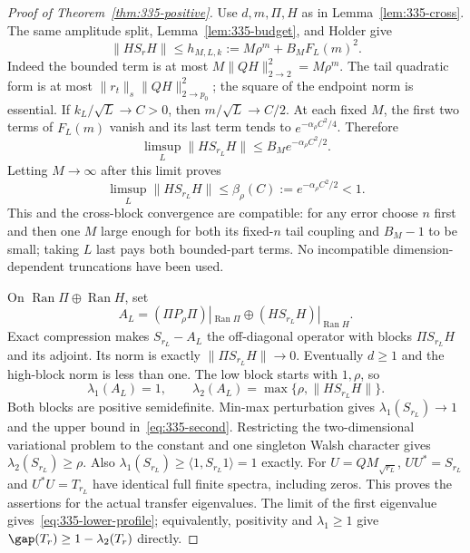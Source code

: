 \begin{proof}[Proof of Theorem~\ref{thm:335-positive}]
Use $d,m,\Pi,H$ as in Lemma~\ref{lem:335-cross}. The same amplitude
split, Lemma~\ref{lem:335-budget}, and Holder give
\begin{equation}\label{eq:335-high}
 \|HS_rH\|\le h_{M,L,k}:=M\rho^m+B_MF_L(m)^2.
\end{equation}
Indeed the bounded term is at most $M\|QH\|_{2\to2}^2=M\rho^m$.
The tail quadratic form is at most
$\|r_t\|_s\|QH\|_{2\to p_0}^2$; the square of the endpoint norm
is essential. If $k_L/\sqrt L\to C>0$, then $m/\sqrt L\to C/2$.
At each fixed $M$, the first two terms of $F_L(m)$ vanish and its last
term tends to $e^{-\alpha_\rho C^2/4}$. Therefore
\[
 \limsup_L\|HS_{r_L}H\|\le B_Me^{-\alpha_\rho C^2/2}.
\]
Letting $M\to\infty$ after this limit proves
\begin{equation}\label{eq:335-beta}
 \limsup_L\|HS_{r_L}H\|\le\beta_\rho(C)
 :=e^{-\alpha_\rho C^2/2}<1.
\end{equation}
This and the cross-block convergence are compatible: for any error choose
$n$ first and then one $M$ large enough for both its fixed-$n$ tail
coupling and $B_M-1$ to be small; taking $L$ last pays both bounded-part
terms. No incompatible dimension-dependent truncations have been used.

On $\operatorname{Ran}\Pi\oplus\operatorname{Ran}H$, set
\[
 A_L=(\Pi P_\rho\Pi)|_{\operatorname{Ran}\Pi}
       \oplus(HS_{r_L}H)|_{\operatorname{Ran}H}.
\]
Exact compression makes $S_{r_L}-A_L$ the off-diagonal operator with
blocks $\Pi S_{r_L}H$ and its adjoint. Its norm is exactly
$\|\Pi S_{r_L}H\|\to0$. Eventually $d\ge1$ and the high-block
norm is less than one. The low block starts with $1,\rho$, so
\[
 \lambda_1(A_L)=1,\qquad
 \lambda_2(A_L)=\max\{\rho,\|HS_{r_L}H\|\}.
\]
Both blocks are positive semidefinite. Min-max perturbation gives
$\lambda_1(S_{r_L})\to1$ and the upper bound in~\eqref{eq:335-second}.
Restricting the two-dimensional variational problem to the constant and
one singleton Walsh character gives $\lambda_2(S_{r_L})\ge\rho$.
Also $\lambda_1(S_{r_L})\ge\langle1,S_{r_L}1\rangle=1$ exactly.
For $U=QM_{\sqrt{r_L}}$, $UU^*=S_{r_L}$ and $U^*U=T_{r_L}$ have
identical full finite spectra, including zeros. This proves the assertions
for the actual transfer eigenvalues. The limit of the first eigenvalue
gives~\eqref{eq:335-lower-profile}; equivalently, positivity and
$\lambda_1\ge1$ give $\gap(T_r)\ge1-\lambda_2(T_r)$ directly.


\end{proof}
